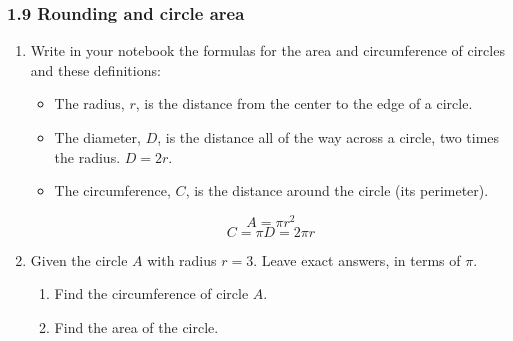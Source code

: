 

\fancyhead[LE]{\thepage}



\subsubsection*{1.9 Rounding and circle area}
\begin{enumerate}
\item Write in your notebook the formulas for the area and circumference of circles and these definitions:
\begin{itemize}
  \item The radius, $r$, is the distance from the center to the edge of a circle. 
  \item The diameter, $D$, is the distance all of the way across a circle, two times the radius. $D=2r$. 
  \item The circumference, $C$, is the distance around the circle (its perimeter).
  
\end{itemize}
  \[A=\pi r^2\]
  \[C=\pi D = 2\pi r\]
  
\item Given the circle $A$ with radius $r=3$. Leave exact answers, in terms of $\pi$.
  \begin{multicols}{2}
    \begin{enumerate}
      \item Find the circumference of circle $A$. \vspace{1cm}
      \item Find the area of the circle.\vspace{2cm}
    \end{enumerate}
    \begin{flushright}
  \end{flushright}
  \end{multicols}


\end{enumerate}
